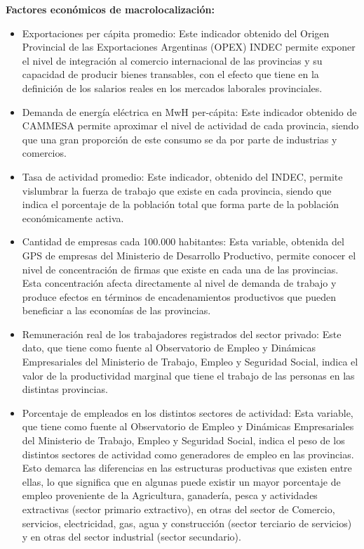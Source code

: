 \documentclass[12pt,a4paper]{article}
\begin{document}
\textbf{Factores económicos de macrolocalización:}
\begin{itemize}
\item Exportaciones per cápita promedio: Este indicador obtenido del Origen Provincial de las Exportaciones Argentinas (OPEX) INDEC permite exponer el nivel de integración al comercio internacional de las provincias y su capacidad de producir bienes transables, con el efecto que tiene en la definición de los salarios reales en los mercados laborales provinciales.

\item Demanda de energía eléctrica en MwH per-cápita: Este indicador obtenido de CAMMESA permite aproximar el nivel de actividad de cada provincia, siendo que una gran proporción de este consumo se da por parte de industrias y comercios.

\item Tasa de actividad promedio: Este indicador, obtenido del INDEC, permite vislumbrar la fuerza de trabajo que existe en cada provincia, siendo que indica el porcentaje de la población total que forma parte de la población económicamente activa.

\item Cantidad de empresas cada 100.000 habitantes: Esta variable, obtenida del GPS de empresas del Ministerio de Desarrollo Productivo, permite conocer el nivel de concentración de firmas que existe en cada una de las provincias. Esta concentración afecta directamente al nivel de demanda de trabajo y produce efectos en términos de encadenamientos productivos que pueden beneficiar a las economías de las provincias.

\item Remuneración real de los trabajadores registrados del sector privado: Este dato, que tiene como fuente al Observatorio de Empleo y Dinámicas Empresariales del Ministerio de Trabajo, Empleo y Seguridad Social, indica el valor de la productividad marginal que tiene el trabajo de las personas  en las distintas provincias.

\item Porcentaje de empleados en los distintos sectores de actividad: Esta variable, que tiene como fuente al Observatorio de Empleo y Dinámicas Empresariales del Ministerio de Trabajo, Empleo y Seguridad Social, indica el peso de los distintos sectores de actividad como generadores de empleo en las provincias. Esto demarca las diferencias en las estructuras productivas que existen entre ellas, lo que significa que en algunas puede existir un mayor porcentaje de empleo proveniente de la Agricultura, ganadería, pesca y actividades extractivas (sector primario extractivo), en otras del sector de Comercio, servicios, electricidad, gas, agua y construcción (sector terciario de servicios) y en otras del sector industrial (sector secundario).


\end{itemize}
\end{document}
